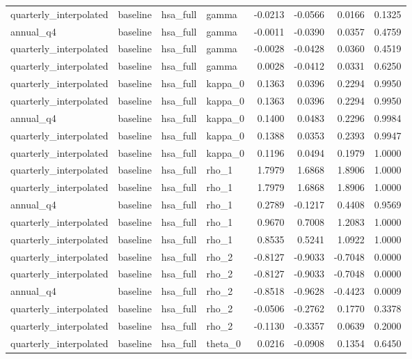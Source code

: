 \begin{tabular}{llllrrrr}
quarterly\_interpolated & baseline & hsa\_full & gamma & -0.0213 & -0.0566 & 0.0166 & 0.1325 \\
annual\_q4 & baseline & hsa\_full & gamma & -0.0011 & -0.0390 & 0.0357 & 0.4759 \\
quarterly\_interpolated & baseline & hsa\_full & gamma & -0.0028 & -0.0428 & 0.0360 & 0.4519 \\
quarterly\_interpolated & baseline & hsa\_full & gamma & 0.0028 & -0.0412 & 0.0331 & 0.6250 \\
quarterly\_interpolated & baseline & hsa\_full & kappa\_0 & 0.1363 & 0.0396 & 0.2294 & 0.9950 \\
quarterly\_interpolated & baseline & hsa\_full & kappa\_0 & 0.1363 & 0.0396 & 0.2294 & 0.9950 \\
annual\_q4 & baseline & hsa\_full & kappa\_0 & 0.1400 & 0.0483 & 0.2296 & 0.9984 \\
quarterly\_interpolated & baseline & hsa\_full & kappa\_0 & 0.1388 & 0.0353 & 0.2393 & 0.9947 \\
quarterly\_interpolated & baseline & hsa\_full & kappa\_0 & 0.1196 & 0.0494 & 0.1979 & 1.0000 \\
quarterly\_interpolated & baseline & hsa\_full & rho\_1 & 1.7979 & 1.6868 & 1.8906 & 1.0000 \\
quarterly\_interpolated & baseline & hsa\_full & rho\_1 & 1.7979 & 1.6868 & 1.8906 & 1.0000 \\
annual\_q4 & baseline & hsa\_full & rho\_1 & 0.2789 & -0.1217 & 0.4408 & 0.9569 \\
quarterly\_interpolated & baseline & hsa\_full & rho\_1 & 0.9670 & 0.7008 & 1.2083 & 1.0000 \\
quarterly\_interpolated & baseline & hsa\_full & rho\_1 & 0.8535 & 0.5241 & 1.0922 & 1.0000 \\
quarterly\_interpolated & baseline & hsa\_full & rho\_2 & -0.8127 & -0.9033 & -0.7048 & 0.0000 \\
quarterly\_interpolated & baseline & hsa\_full & rho\_2 & -0.8127 & -0.9033 & -0.7048 & 0.0000 \\
annual\_q4 & baseline & hsa\_full & rho\_2 & -0.8518 & -0.9628 & -0.4423 & 0.0009 \\
quarterly\_interpolated & baseline & hsa\_full & rho\_2 & -0.0506 & -0.2762 & 0.1770 & 0.3378 \\
quarterly\_interpolated & baseline & hsa\_full & rho\_2 & -0.1130 & -0.3357 & 0.0639 & 0.2000 \\
quarterly\_interpolated & baseline & hsa\_full & theta\_0 & 0.0216 & -0.0908 & 0.1354 & 0.6450 \\

\end{tabular}
